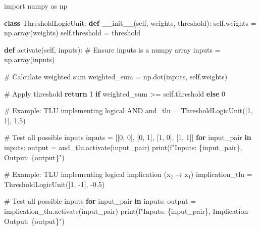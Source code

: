 \documentclass[
  letterpaper,
  DIV=11,
  numbers=noendperiod]{scrreprt}
\newenvironment{Shaded}{\begin{snugshade}}{\end{snugshade}}
\newcommand{\BuiltInTok}[1]{\textcolor[rgb]{0.00,0.23,0.31}{#1}}
\newcommand{\CommentTok}[1]{\textcolor[rgb]{0.37,0.37,0.37}{#1}}
\newcommand{\ControlFlowTok}[1]{\textcolor[rgb]{0.00,0.23,0.31}{\textbf{#1}}}
\newcommand{\DecValTok}[1]{\textcolor[rgb]{0.68,0.00,0.00}{#1}}
\newcommand{\FloatTok}[1]{\textcolor[rgb]{0.68,0.00,0.00}{#1}}
\newcommand{\FunctionTok}[1]{\textcolor[rgb]{0.28,0.35,0.67}{#1}}
\newcommand{\ImportTok}[1]{\textcolor[rgb]{0.00,0.46,0.62}{#1}}
\newcommand{\KeywordTok}[1]{\textcolor[rgb]{0.00,0.23,0.31}{\textbf{#1}}}
\newcommand{\NormalTok}[1]{\textcolor[rgb]{0.00,0.23,0.31}{#1}}
\newcommand{\OperatorTok}[1]{\textcolor[rgb]{0.37,0.37,0.37}{#1}}
\newcommand{\SpecialCharTok}[1]{\textcolor[rgb]{0.37,0.37,0.37}{#1}}
\newcommand{\SpecialStringTok}[1]{\textcolor[rgb]{0.13,0.47,0.30}{#1}}
\newcommand{\VariableTok}[1]{\textcolor[rgb]{0.07,0.07,0.07}{#1}}
\begin{document}
\begin{Shaded}
\begin{Highlighting}[]
\ImportTok{import}\NormalTok{ numpy }\ImportTok{as}\NormalTok{ np}

\KeywordTok{class}\NormalTok{ ThresholdLogicUnit:}
    \KeywordTok{def} \FunctionTok{\_\_init\_\_}\NormalTok{(}\VariableTok{self}\NormalTok{, weights, threshold):}
        \VariableTok{self}\NormalTok{.weights }\OperatorTok{=}\NormalTok{ np.array(weights)}
        \VariableTok{self}\NormalTok{.threshold }\OperatorTok{=}\NormalTok{ threshold}

    \KeywordTok{def}\NormalTok{ activate(}\VariableTok{self}\NormalTok{, inputs):}
        \CommentTok{\# Ensure inputs is a numpy array}
\NormalTok{        inputs }\OperatorTok{=}\NormalTok{ np.array(inputs)}

        \CommentTok{\# Calculate weighted sum}
\NormalTok{        weighted\_sum }\OperatorTok{=}\NormalTok{ np.dot(inputs, }\VariableTok{self}\NormalTok{.weights)}

        \CommentTok{\# Apply threshold}
        \ControlFlowTok{return} \DecValTok{1} \ControlFlowTok{if}\NormalTok{ weighted\_sum }\OperatorTok{\textgreater{}=} \VariableTok{self}\NormalTok{.threshold }\ControlFlowTok{else} \DecValTok{0}

\CommentTok{\# Example: TLU implementing logical AND}
\NormalTok{and\_tlu }\OperatorTok{=}\NormalTok{ ThresholdLogicUnit([}\DecValTok{1}\NormalTok{, }\DecValTok{1}\NormalTok{], }\FloatTok{1.5}\NormalTok{)}

\CommentTok{\# Test all possible inputs}
\NormalTok{inputs }\OperatorTok{=}\NormalTok{ [[}\DecValTok{0}\NormalTok{, }\DecValTok{0}\NormalTok{], [}\DecValTok{0}\NormalTok{, }\DecValTok{1}\NormalTok{], [}\DecValTok{1}\NormalTok{, }\DecValTok{0}\NormalTok{], [}\DecValTok{1}\NormalTok{, }\DecValTok{1}\NormalTok{]]}
\ControlFlowTok{for}\NormalTok{ input\_pair }\KeywordTok{in}\NormalTok{ inputs:}
\NormalTok{    output }\OperatorTok{=}\NormalTok{ and\_tlu.activate(input\_pair)}
    \BuiltInTok{print}\NormalTok{(}\SpecialStringTok{f"Inputs: }\SpecialCharTok{\{}\NormalTok{input\_pair}\SpecialCharTok{\}}\SpecialStringTok{, Output: }\SpecialCharTok{\{}\NormalTok{output}\SpecialCharTok{\}}\SpecialStringTok{"}\NormalTok{)}

\CommentTok{\# Example: TLU implementing logical implication (x₂ → x₁)}
\NormalTok{implication\_tlu }\OperatorTok{=}\NormalTok{ ThresholdLogicUnit([}\DecValTok{1}\NormalTok{, }\OperatorTok{{-}}\DecValTok{1}\NormalTok{], }\OperatorTok{{-}}\FloatTok{0.5}\NormalTok{)}

\CommentTok{\# Test all possible inputs}
\ControlFlowTok{for}\NormalTok{ input\_pair }\KeywordTok{in}\NormalTok{ inputs:}
\NormalTok{    output }\OperatorTok{=}\NormalTok{ implication\_tlu.activate(input\_pair)}
    \BuiltInTok{print}\NormalTok{(}\SpecialStringTok{f"Inputs: }\SpecialCharTok{\{}\NormalTok{input\_pair}\SpecialCharTok{\}}\SpecialStringTok{, Implication Output: }\SpecialCharTok{\{}\NormalTok{output}\SpecialCharTok{\}}\SpecialStringTok{"}\NormalTok{)}
\end{Highlighting}
\end{Shaded}
\end{document}

